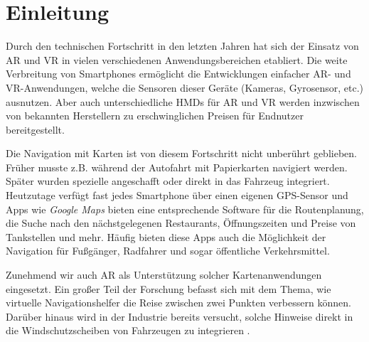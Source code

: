 \chapter{Einleitung}
\label{chap:einleitung}
Durch den technischen Fortschritt in den letzten Jahren hat sich der Einsatz von \gls{AR} und \gls{VR} in vielen verschiedenen Anwendungsbereichen etabliert.
Die weite Verbreitung von Smartphones ermöglicht die Entwicklungen einfacher \gls{AR}- und \gls{VR}-Anwendungen, welche die Sensoren dieser Geräte (Kameras, Gyrosensor, etc.) ausnutzen.
Aber auch unterschiedliche \glspl{HMD} für \gls{AR} und \gls{VR} werden inzwischen von bekannten Herstellern zu erschwinglichen Preisen für Endnutzer bereitgestellt.

Die Navigation mit Karten ist von diesem Fortschritt nicht unberührt geblieben.
Früher musste z.B. während der Autofahrt mit Papierkarten navigiert werden.
Später wurden spezielle  angeschafft oder direkt in das Fahrzeug integriert.
Heutzutage verfügt fast jedes Smartphone über einen eigenen \gls{GPS}-Sensor und Apps wie \emph{Google Maps} \parencite{GoogleLLC2018} bieten eine entsprechende Software für die Routenplanung, die Suche nach den nächstgelegenen Restaurants, Öffnungszeiten und Preise von Tankstellen und mehr.  
Häufig bieten diese Apps auch die Möglichkeit der Navigation für Fußgänger, Radfahrer und sogar öffentliche Verkehrsmittel.

Zunehmend wir auch \gls{AR} als Unterstützung solcher Kartenanwendungen eingesetzt.
Ein großer Teil der Forschung befasst sich mit dem Thema, wie virtuelle Navigationshelfer die Reise zwischen zwei Punkten verbessern können.
Darüber hinaus wird in der Industrie bereits versucht, solche Hinweise direkt in die Windschutzscheiben von Fahrzeugen zu integrieren \parencites{Cunningham2017}{Sygic2018}.

